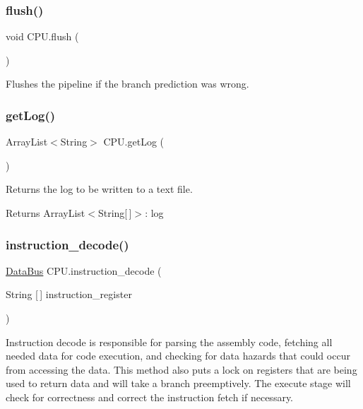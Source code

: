 \subsubsection{\texorpdfstring{flush()}{flush()}}
{\footnotesize\ttfamily void C\+P\+U.\+flush (\begin{DoxyParamCaption}{ }\end{DoxyParamCaption})\hspace{0.3cm}{\ttfamily [private]}}

Flushes the pipeline if the branch prediction was wrong. \mbox{\label{class_c_p_u_a594b92f9f813ab337f27eff0ec9bd0c5}} 
\subsubsection{\texorpdfstring{get\+Log()}{getLog()}}
{\footnotesize\ttfamily Array\+List$<$String$>$ C\+P\+U.\+get\+Log (\begin{DoxyParamCaption}{ }\end{DoxyParamCaption})\hspace{0.3cm}{\ttfamily [package]}}

Returns the log to be written to a text file. \begin{DoxyReturn}{Returns}
Array\+List$<$\+String\mbox{[}$\,$\mbox{]}$>$\+: log 
\end{DoxyReturn}
\mbox{\label{class_c_p_u_aa2f0a271b5c6137569fe9c206388bdcc}} 
\subsubsection{\texorpdfstring{instruction\+\_\+decode()}{instruction\_decode()}}
{\footnotesize\ttfamily \mbox{\hyperlink{class_data_bus}{Data\+Bus}} C\+P\+U.\+instruction\+\_\+decode (\begin{DoxyParamCaption}\item[{String \mbox{[}$\,$\mbox{]}}]{instruction\+\_\+register }\end{DoxyParamCaption})\hspace{0.3cm}{\ttfamily [private]}}

Instruction decode is responsible for parsing the assembly code, fetching all needed data for code execution, and checking for data hazards that could occur from accessing the data. This method also puts a lock on registers that are being used to return data and will take a branch preemptively. The execute stage will check for correctness and correct the instruction fetch if necessary.


